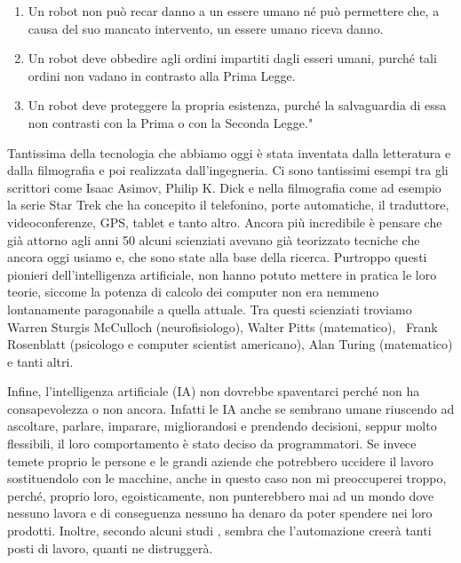 \documentclass[12pt]{book} %
\begin{document}
\begin{enumerate}
\item Un robot non può recar danno a un essere umano né può permettere che, a causa del suo mancato intervento, un
essere umano riceva danno.
\item Un robot deve obbedire agli ordini impartiti dagli esseri umani, purché tali ordini non vadano in contrasto alla
Prima Legge.
\item Un robot deve proteggere la propria esistenza, purché la salvaguardia di essa non contrasti con la Prima o con la
Seconda Legge."
\end{enumerate}
Tantissima della tecnologia che abbiamo oggi è stata inventata dalla letteratura e dalla filmografia e poi realizzata
dall'ingegneria. Ci sono tantissimi esempi tra gli scrittori come Isaac Asimov, Philip K. Dick e
nella filmografia come ad esempio la serie Star Trek che ha concepito il telefonino, porte automatiche, il traduttore,
videoconferenze, GPS, tablet e tanto altro. Ancora più incredibile è pensare che già attorno agli anni 50 alcuni
scienziati avevano già teorizzato tecniche che ancora oggi usiamo e, che sono state alla base della ricerca. Purtroppo
questi pionieri dell'intelligenza artificiale, non hanno potuto mettere in pratica le loro teorie,
siccome la potenza di calcolo dei computer non era nemmeno lontanamente paragonabile a quella attuale. Tra questi
scienziati troviamo Warren Sturgis McCulloch (neurofisiologo), Walter Pitts (matematico), \ Frank Rosenblatt (psicologo
e computer scientist americano), Alan Turing (matematico) e tanti altri.

Infine, l'intelligenza artificiale (IA) non dovrebbe spaventarci perché non ha consapevolezza o non
ancora. Infatti le IA anche se sembrano umane riuscendo ad ascoltare, parlare, imparare, migliorandosi e prendendo
decisioni, seppur molto flessibili, il loro comportamento è stato deciso da programmatori.
Se invece temete proprio le persone e le grandi aziende che potrebbero uccidere il lavoro sostituendolo con le macchine, anche in questo caso non mi preoccuperei troppo, perché, proprio loro, egoisticamente, non punterebbero mai ad un mondo dove nessuno lavora e di conseguenza nessuno ha denaro da poter spendere nei loro prodotti. Inoltre, secondo alcuni studi , sembra che l'automazione creerà tanti posti di lavoro, quanti ne distruggerà.
\end{document}
